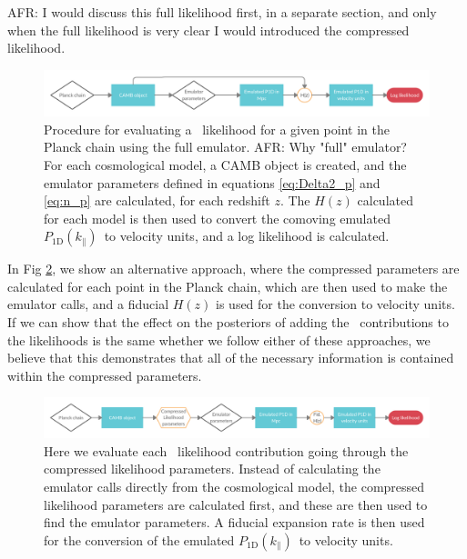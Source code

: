 \documentclass[preprintnumbers,prd,superscriptaddress,notitlepage,nofootinbib] {revtex4-1}
\newcommand{\afr}[1]{{\color{red}AFR: #1}}
\newcommand{\fluxpower}{$P_\mathrm{1D}(k_\parallel)$}
\begin{document}
\afr{I would discuss this full likelihood first, in a separate section, and only when the full likelihood is very clear I would introduced the compressed likelihood.}

\begin{figure}[ht]
    \begin{center}
     \includegraphics[scale=0.2]{Figures/Parameter_mapping.png}
    \end{center}
    \caption{Procedure for evaluating a \lyaf\ likelihood for a given
    point in the Planck chain using the full emulator. 
    \afr{Why "full" emulator?}
    For each cosmological
    model, a \textsc{CAMB} object is created, and the emulator parameters defined
    in equations \ref{eq:Delta2_p} and \ref{eq:n_p} are calculated, for each redshift $z$.
    The $H(z)$ calculated
    for each model is then used to convert the comoving emulated \fluxpower\
    to velocity units, and a log likelihood is calculated.}
    \label{fig:param_map1}
\end{figure}

In Fig \ref{fig:param_map2}, we show an alternative approach, where the compressed
parameters are calculated for each point in the Planck chain, which are then used
to make the emulator calls, and a fiducial $H(z)$ is used for the conversion to
velocity units. If we can show that the effect on the posteriors of adding the \lyaf\
contributions to the likelihoods is the same whether we follow either of these
approaches, we believe that this demonstrates that all of the necessary information
is contained within the compressed parameters.

\begin{figure}[ht]
    \begin{center}
     \includegraphics[scale=0.2]{Figures/Compressed_test.png}
    \end{center}
    \caption{Here we evaluate each \lyaf\ likelihood contribution going
    through the compressed likelihood parameters. Instead of calculating
    the emulator calls directly from the cosmological model, the compressed
    likelihood parameters are calculated first, and these are then used to
    find the emulator parameters. A fiducial expansion rate is then used for
    the conversion of the emulated \fluxpower\ to velocity units.}
    \label{fig:param_map2}
\end{figure}
\end{document}
